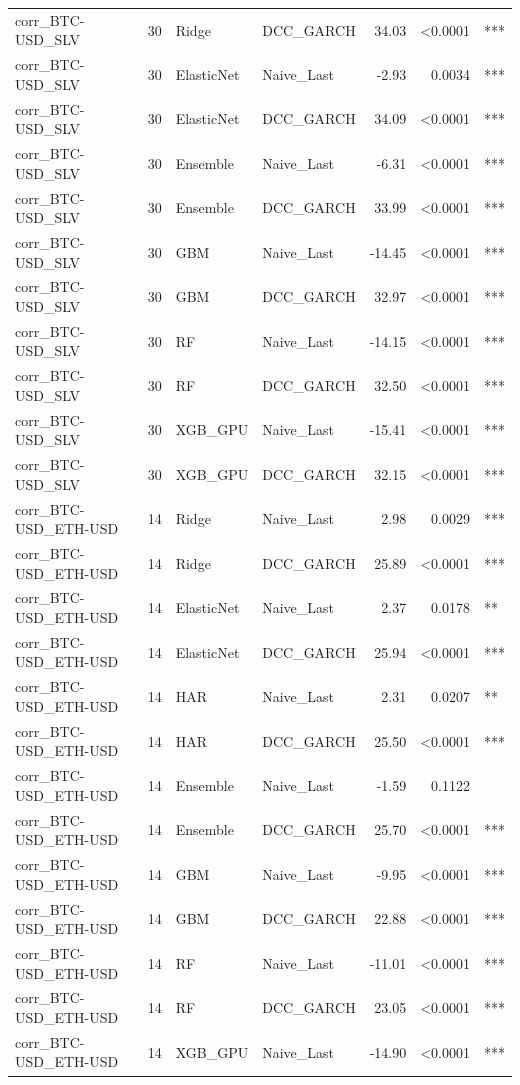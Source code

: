 \begin{table}[H]
\begin{tabular}{llllrrl}
corr_BTC-USD_SLV & 30 & Ridge & DCC_GARCH & 34.03 & <0.0001 & *** \\
corr_BTC-USD_SLV & 30 & ElasticNet & Naive_Last & -2.93 & 0.0034 & *** \\
corr_BTC-USD_SLV & 30 & ElasticNet & DCC_GARCH & 34.09 & <0.0001 & *** \\
corr_BTC-USD_SLV & 30 & Ensemble & Naive_Last & -6.31 & <0.0001 & *** \\
corr_BTC-USD_SLV & 30 & Ensemble & DCC_GARCH & 33.99 & <0.0001 & *** \\
corr_BTC-USD_SLV & 30 & GBM & Naive_Last & -14.45 & <0.0001 & *** \\
corr_BTC-USD_SLV & 30 & GBM & DCC_GARCH & 32.97 & <0.0001 & *** \\
corr_BTC-USD_SLV & 30 & RF & Naive_Last & -14.15 & <0.0001 & *** \\
corr_BTC-USD_SLV & 30 & RF & DCC_GARCH & 32.50 & <0.0001 & *** \\
corr_BTC-USD_SLV & 30 & XGB_GPU & Naive_Last & -15.41 & <0.0001 & *** \\
corr_BTC-USD_SLV & 30 & XGB_GPU & DCC_GARCH & 32.15 & <0.0001 & *** \\
corr_BTC-USD_ETH-USD & 14 & Ridge & Naive_Last & 2.98 & 0.0029 & *** \\
corr_BTC-USD_ETH-USD & 14 & Ridge & DCC_GARCH & 25.89 & <0.0001 & *** \\
corr_BTC-USD_ETH-USD & 14 & ElasticNet & Naive_Last & 2.37 & 0.0178 & ** \\
corr_BTC-USD_ETH-USD & 14 & ElasticNet & DCC_GARCH & 25.94 & <0.0001 & *** \\
corr_BTC-USD_ETH-USD & 14 & HAR & Naive_Last & 2.31 & 0.0207 & ** \\
corr_BTC-USD_ETH-USD & 14 & HAR & DCC_GARCH & 25.50 & <0.0001 & *** \\
corr_BTC-USD_ETH-USD & 14 & Ensemble & Naive_Last & -1.59 & 0.1122 &  \\
corr_BTC-USD_ETH-USD & 14 & Ensemble & DCC_GARCH & 25.70 & <0.0001 & *** \\
corr_BTC-USD_ETH-USD & 14 & GBM & Naive_Last & -9.95 & <0.0001 & *** \\
corr_BTC-USD_ETH-USD & 14 & GBM & DCC_GARCH & 22.88 & <0.0001 & *** \\
corr_BTC-USD_ETH-USD & 14 & RF & Naive_Last & -11.01 & <0.0001 & *** \\
corr_BTC-USD_ETH-USD & 14 & RF & DCC_GARCH & 23.05 & <0.0001 & *** \\
corr_BTC-USD_ETH-USD & 14 & XGB_GPU & Naive_Last & -14.90 & <0.0001 & *** \\

\end{tabular}
\end{table}
